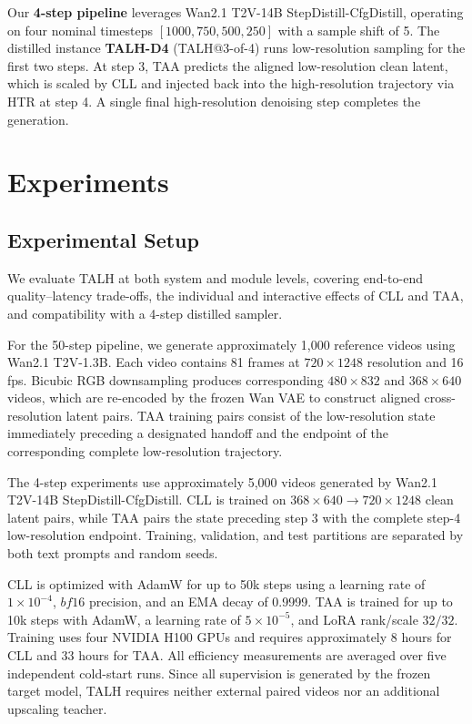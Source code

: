 Our \textbf{4-step pipeline} leverages Wan2.1 T2V-14B
StepDistill-CfgDistill, operating on four nominal timesteps
\([1000, 750, 500, 250]\) with a sample shift of 5. The distilled
instance \textbf{TALH-D4} (TALH@3-of-4) runs low-resolution sampling for
the first two steps. At step 3, TAA predicts the aligned low-resolution
clean latent, which is scaled by CLL and injected back into the
high-resolution trajectory via HTR at step 4. A single final
high-resolution denoising step completes the generation.

\section{Experiments}

\subsection{Experimental Setup}

We evaluate TALH at both system and module levels, covering end-to-end
quality--latency trade-offs, the individual and interactive effects of
CLL and TAA, and compatibility with a 4-step distilled sampler.

For the 50-step pipeline, we generate approximately 1,000 reference
videos using Wan2.1 T2V-1.3B. Each video contains 81 frames at
\(720\times1248\) resolution and 16 fps. Bicubic RGB downsampling
produces corresponding \(480\times832\) and \(368\times640\) videos,
which are re-encoded by the frozen Wan VAE to construct aligned
cross-resolution latent pairs. TAA training pairs consist of the
low-resolution state immediately preceding a designated handoff and the
endpoint of the corresponding complete low-resolution trajectory.

The 4-step experiments use approximately 5,000 videos generated by
Wan2.1 T2V-14B StepDistill-CfgDistill. CLL is trained on
\(368\times640\rightarrow720\times1248\) clean latent pairs, while TAA
pairs the state preceding step 3 with the complete step-4
low-resolution endpoint. Training, validation, and test partitions are
separated by both text prompts and random seeds.

CLL is optimized with AdamW for up to 50k steps using a learning rate of
\(1\times10^{-4}\), \(bf16\) precision, and an EMA decay of 0.9999.
TAA is trained for up to 10k steps with AdamW, a learning rate of
\(5\times10^{-5}\), and LoRA rank/scale \(32/32\). Training uses four
NVIDIA H100 GPUs and requires approximately 8 hours for CLL and 33 hours
for TAA. All efficiency measurements are averaged over five independent
cold-start runs. Since all supervision is generated by the frozen target
model, TALH requires neither external paired videos nor an additional
upscaling teacher.

